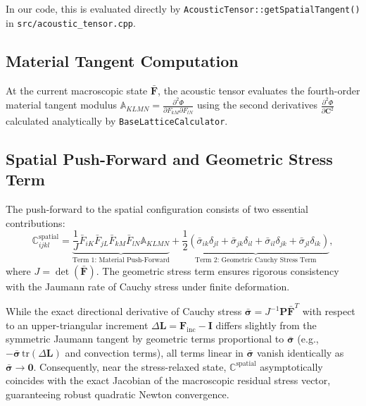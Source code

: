 \documentclass[11pt,a4paper]{article}
\begin{document}
In our code, this is evaluated directly by \texttt{AcousticTensor::getSpatialTangent()} in \texttt{src/acoustic\_tensor.cpp}.

\subsection{Material Tangent Computation}

At the current macroscopic state $\bar{\mathbf{F}}$, the acoustic tensor evaluates the fourth-order material tangent modulus $\mathbb{A}_{KLMN} = \frac{\partial^2 \Phi}{\partial F_{kM} \partial F_{lN}}$ using the second derivatives $\frac{\partial^2 \Phi}{\partial \mathbf{C}^2}$ calculated analytically by \texttt{BaseLatticeCalculator}.

\subsection{Spatial Push-Forward and Geometric Stress Term}

The push-forward to the spatial configuration consists of two essential contributions:
\begin{equation}
\mathbb{C}_{ijkl}^{\text{spatial}} = \underbrace{\frac{1}{J} \bar{F}_{iK} \bar{F}_{jL} \bar{F}_{kM} \bar{F}_{lN} \mathbb{A}_{KLMN}}_{\text{Term 1: Material Push-Forward}} + \underbrace{\frac{1}{2}\left( \bar{\sigma}_{ik}\delta_{jl} + \bar{\sigma}_{jk}\delta_{il} + \bar{\sigma}_{il}\delta_{jk} + \bar{\sigma}_{jl}\delta_{ik} \right)}_{\text{Term 2: Geometric Cauchy Stress Term}},
\end{equation}
where $J = \det(\bar{\mathbf{F}})$. The geometric stress term ensures rigorous consistency with the Jaumann rate of Cauchy stress under finite deformation.

\begin{infobox}
While the exact directional derivative of Cauchy stress $\bar{\boldsymbol{\sigma}} = J^{-1} \mathbf{P}\bar{\mathbf{F}}^T$ with respect to an upper-triangular increment $\Delta \mathbf{L} = \mathbf{F}_{\text{inc}} - \mathbf{I}$ differs slightly from the symmetric Jaumann tangent by geometric terms proportional to $\bar{\boldsymbol{\sigma}}$ (e.g., $-\bar{\boldsymbol{\sigma}}\,\mathrm{tr}(\Delta\mathbf{L})$ and convection terms), all terms linear in $\bar{\boldsymbol{\sigma}}$ vanish identically as $\bar{\boldsymbol{\sigma}} \to \mathbf{0}$. Consequently, near the stress-relaxed state, $\mathbb{C}^{\text{spatial}}$ asymptotically coincides with the exact Jacobian of the macroscopic residual stress vector, guaranteeing robust quadratic Newton convergence.
\end{infobox}
\end{document}
